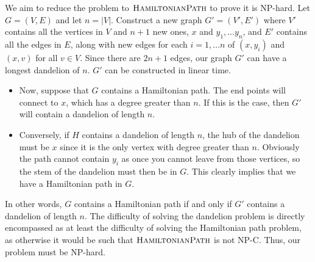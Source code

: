 \documentclass{article}
\begin{document}
\begin{solution}
We aim to reduce the problem to $\mathsf{\textsc{HamiltonianPath}}$ to prove it is NP-hard. Let $G = (V,E)$ and let $n = |V|$. Construct a new graph $G' = (V', E')$ where $V'$ contains all the vertices in $V$ and $n + 1$ new ones, $x$ and $y_1, \dots y_n$, and $E'$ contains all the edges in $E$, along with new edges for each $i = 1, \dots n$ of $(x, y_i)$ and $(x, v)$ for all $v \in V$. Since there are $2n+1$ edges, our graph $G'$ can have a longest dandelion of $n$. $G'$ can be constructed in linear time.

\begin{itemize}
	\item Now, suppose that $G$ contains a Hamiltonian path. The end points will connect to $x$, which has a degree greater than $n$. If this is the case, then $G'$ will contain a dandelion of length $n$.
	\item Conversely, if $H$ contains a dandelion of length $n$, the hub of the dandelion must be $x$ since it is the only vertex with degree greater than $n$. Obviously the path cannot contain $y_i$ as once you cannot leave from those vertices, so the stem of the dandelion must then be in $G$. This clearly implies that we have a Hamiltonian path in $G$.
\end{itemize}

In other words, $G$ contains a Hamiltonian path if and only if $G'$ contains a dandelion of length $n$. The difficulty of solving the dandelion problem is directly encompassed as at least the difficulty of solving the Hamiltonian path problem, as otherwise it would be such that  $\mathsf{\textsc{HamiltonianPath}}$ is not NP-C. Thus, our problem must be NP-hard.
\end{solution}
\end{document}
